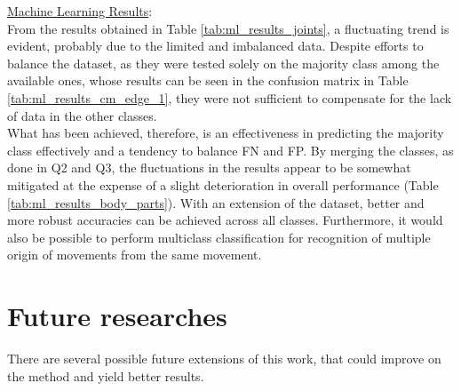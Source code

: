 \underline{Machine Learning Results}:\\
From the results obtained in Table \ref{tab:ml_results_joints}, a fluctuating trend is evident, probably due to the limited and imbalanced data. 
Despite efforts to balance the dataset, as they were tested solely on the majority class among the available ones, whose results can be seen in the confusion matrix in Table \ref{tab:ml_results_cm_edge_1}, 
they were not sufficient to compensate for the lack of data in the other classes. \\
What has been achieved, therefore, is an effectiveness in predicting the majority class effectively and a tendency to balance FN and FP. 
By merging the classes, as done in Q2 and Q3, the fluctuations in the results appear to be somewhat mitigated at the expense of a slight deterioration in overall performance (Table \ref{tab:ml_results_body_parts}).
With an extension of the dataset, better and more robust accuracies can be achieved across all classes.
Furthermore, it would also be possible to perform multiclass classification for recognition of multiple origin of movements from the same movement.\\

\section{Future researches}
\label{sec:future_researches}
There are several possible future extensions of this work, that could improve on the method and yield better results. \\

